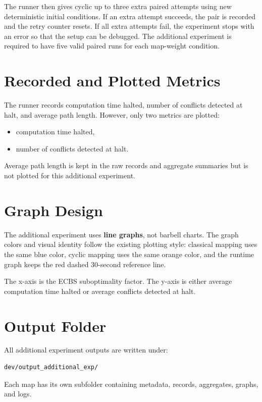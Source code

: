\documentclass[11pt]{article}
\begin{document}
The runner then gives cyclic up to three extra paired attempts using new deterministic initial conditions. If an extra attempt succeeds, the pair is recorded and the retry counter resets. If all extra attempts fail, the experiment stops with an error so that the setup can be debugged. The additional experiment is required to have five valid paired runs for each map-weight condition.

\section{Recorded and Plotted Metrics}

The runner records computation time halted, number of conflicts detected at halt, and average path length. However, only two metrics are plotted:

\begin{itemize}[leftmargin=2em]
    \item computation time halted,
    \item number of conflicts detected at halt.
\end{itemize}

Average path length is kept in the raw records and aggregate summaries but is not plotted for this additional experiment.

\section{Graph Design}

The additional experiment uses \textbf{line graphs}, not barbell charts. The graph colors and visual identity follow the existing plotting style: classical mapping uses the same blue color, cyclic mapping uses the same orange color, and the runtime graph keeps the red dashed 30-second reference line.

The x-axis is the ECBS suboptimality factor. The y-axis is either average computation time halted or average conflicts detected at halt.

\section{Output Folder}

All additional experiment outputs are written under:

\begin{lstlisting}
dev/output_additional_exp/
\end{lstlisting}

Each map has its own subfolder containing metadata, records, aggregates, graphs, and logs.
\end{document}
